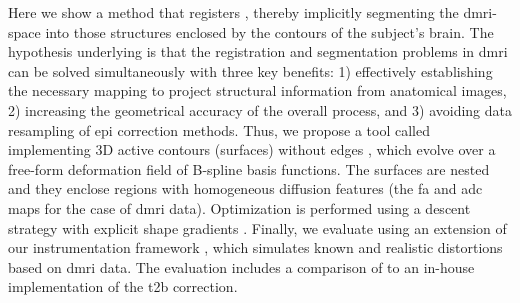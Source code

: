 Here we show a method that registers ,
  thereby implicitly segmenting the \gls*{dmri}-space into those structures enclosed by the contours
  of the subject's brain.
The hypothesis underlying is that the registration and segmentation problems in \gls*{dmri}
  can be solved simultaneously with three key benefits:
  1) effectively establishing the necessary mapping to project structural information from anatomical images,
  2) increasing the geometrical accuracy of the overall process,
  and 3) avoiding data resampling of \gls*{epi} correction methods.
Thus, we propose a tool called \regseg{} implementing 3D active contours (surfaces) without edges
  \citep{chan_active_2001}, which evolve over a free-form deformation field of B-spline
  basis functions.
The surfaces are nested and they enclose regions with homogeneous diffusion features
  (the \gls*{fa} and \gls*{adc} maps for the case of \gls*{dmri} data).
Optimization is performed using a descent strategy with explicit shape gradients
  \citep{besson_dream2s_2003,herbulot_segmentation_2006}.
Finally, we evaluate \regseg{} using an extension of our instrumentation framework
  \citep{esteban_simulationbased_2014}, which simulates known and realistic distortions
  based on \gls*{dmri} data.
The evaluation includes a comparison of \regseg{} to an in-house implementation of
  the \gls*{t2b} correction.
